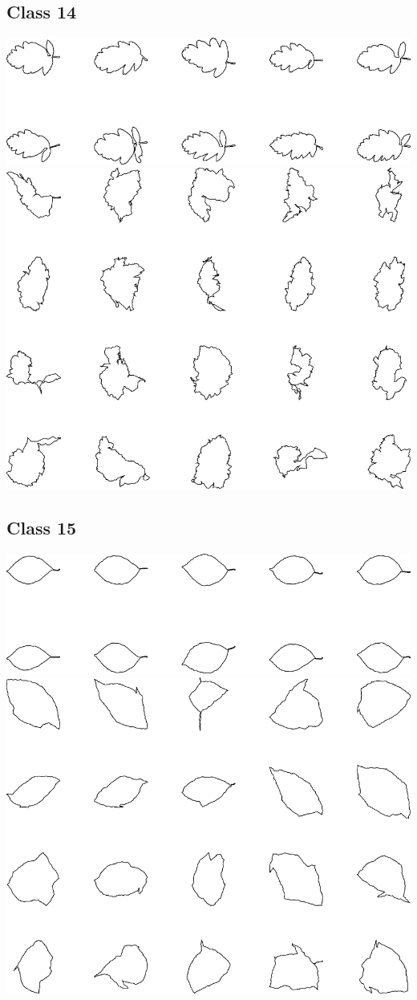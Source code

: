 \documentclass{book}
\begin{document}
\subsection{Class 14}
\includegraphics[width=6in]{output/3.learning/scaled_nts/scaled_nts_training_14.png}
\includegraphics[width=6in]{output/3.learning/scaled_nts/scaled_nts_14.png}
\subsection{Class 15}
\includegraphics[width=6in]{output/3.learning/scaled_nts/scaled_nts_training_15.png}
\includegraphics[width=6in]{output/3.learning/scaled_nts/scaled_nts_15.png}
\end{document}
